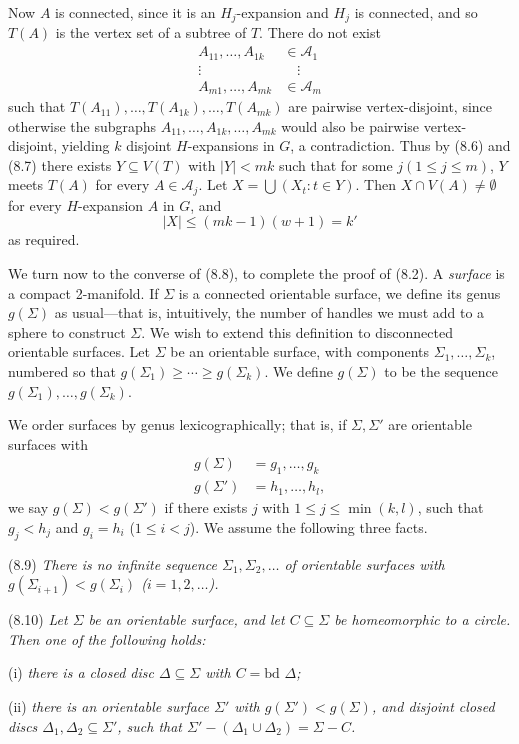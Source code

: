 Now $A$ is connected, since it is an $H_j$-expansion and $H_j$ is connected, and so $T(A)$ is the vertex set of a subtree of $T$. There do not exist
\begin{align*}
A_{11}, \dots, A_{1k} &\in \mathcal{A}_1 \\
\vdots \qquad &\quad \vdots \\
A_{m1}, \dots, A_{mk} &\in \mathcal{A}_m
\end{align*}
such that $T(A_{11}), \dots, T(A_{1k}), \dots, T(A_{mk})$ are pairwise vertex-disjoint, since otherwise the subgraphs $A_{11}, \dots, A_{1k}, \dots, A_{mk}$ would also be pairwise vertex-disjoint, yielding $k$ disjoint $H$-expansions in $G$, a contradiction. Thus by (8.6) and (8.7) there exists $Y \subseteq V(T)$ with $|Y| < mk$ such that for some $j (1 \le j \le m)$, $Y$ meets $T(A)$ for every $A \in \mathcal{A}_j$. Let $X = \bigcup (X_t : t \in Y)$. Then $X \cap V(A) \ne \emptyset$ for every $H$-expansion $A$ in $G$, and
\begin{equation*}
|X| \le (mk - 1)(w + 1) = k'
\end{equation*}
as required.

We turn now to the converse of (8.8), to complete the proof of (8.2). A \textit{surface} is a compact 2-manifold. If $\Sigma$ is a connected orientable surface, we define its genus $g(\Sigma)$ as usual---that is, intuitively, the number of handles we must add to a sphere to construct $\Sigma$. We wish to extend this definition to disconnected orientable surfaces. Let $\Sigma$ be an orientable surface, with components $\Sigma_1, \dots, \Sigma_k$, numbered so that $g(\Sigma_1) \ge \cdots \ge g(\Sigma_k)$. We define $g(\Sigma)$ to be the sequence $g(\Sigma_1), \dots, g(\Sigma_k)$.

We order surfaces by genus lexicographically; that is, if $\Sigma, \Sigma'$ are orientable surfaces with
\begin{align*}
g(\Sigma) &= g_1, \dots, g_k \\
g(\Sigma') &= h_1, \dots, h_l,
\end{align*}
we say $g(\Sigma) < g(\Sigma')$ if there exists $j$ with $1 \le j \le \min(k, l)$, such that $g_j < h_j$ and $g_i = h_i$ ($1 \le i < j$). We assume the following three facts.

\stmt
(8.9) \textit{There is no infinite sequence $\Sigma_1, \Sigma_2, \dots$ of orientable surfaces with $g(\Sigma_{i+1}) < g(\Sigma_i)$ ($i = 1, 2, \dots$).}

\stmt
(8.10) \textit{Let $\Sigma$ be an orientable surface, and let $C \subseteq \Sigma$ be homeomorphic to a circle. Then one of the following holds:}

\hspace*{12pt}(i) \textit{there is a closed disc $\Delta \subseteq \Sigma$ with $C = \text{bd } \Delta$;}

\hspace*{12pt}(ii) \textit{there is an orientable surface $\Sigma'$ with $g(\Sigma') < g(\Sigma)$, and disjoint closed discs $\Delta_1, \Delta_2 \subseteq \Sigma'$, such that $\Sigma' - (\Delta_1 \cup \Delta_2) = \Sigma - C$.}
